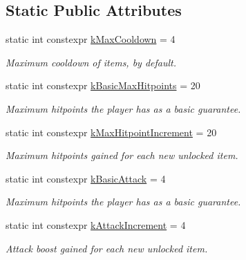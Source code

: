 \subsection*{Static Public Attributes}
\begin{DoxyCompactItemize}
\item 
\mbox{\label{classitem_1_1_item_aae2db5aecbcd2703453521c457bc9419}} 
static int constexpr \hyperlink{classitem_1_1_item_aae2db5aecbcd2703453521c457bc9419}{k\+Max\+Cooldown} = 4
\begin{DoxyCompactList}\small\item\em Maximum cooldown of items, by default. \end{DoxyCompactList}\item 
\mbox{\label{classitem_1_1_item_a445a6061775c6a8cd3ce4e984698b9f6}} 
static int constexpr \hyperlink{classitem_1_1_item_a445a6061775c6a8cd3ce4e984698b9f6}{k\+Basic\+Max\+Hitpoints} = 20
\begin{DoxyCompactList}\small\item\em Maximum hitpoints the player has as a basic guarantee. \end{DoxyCompactList}\item 
\mbox{\label{classitem_1_1_item_a30b4c60171ecd398d5ff79f5340f40cb}} 
static int constexpr \hyperlink{classitem_1_1_item_a30b4c60171ecd398d5ff79f5340f40cb}{k\+Max\+Hitpoint\+Increment} = 20
\begin{DoxyCompactList}\small\item\em Maximum hitpoints gained for each new unlocked item. \end{DoxyCompactList}\item 
\mbox{\label{classitem_1_1_item_a198b43663d2cafe26b5a495738882df7}} 
static int constexpr \hyperlink{classitem_1_1_item_a198b43663d2cafe26b5a495738882df7}{k\+Basic\+Attack} = 4
\begin{DoxyCompactList}\small\item\em Maximum hitpoints the player has as a basic guarantee. \end{DoxyCompactList}\item 
\mbox{\label{classitem_1_1_item_a00def77d22585b09011b09981f3ad3b6}} 
static int constexpr \hyperlink{classitem_1_1_item_a00def77d22585b09011b09981f3ad3b6}{k\+Attack\+Increment} = 4
\begin{DoxyCompactList}\small\item\em Attack boost gained for each new unlocked item. \end{DoxyCompactList}\end{DoxyCompactItemize}

